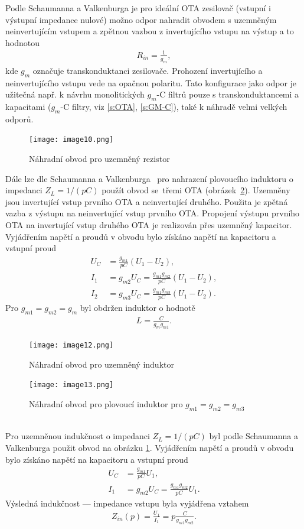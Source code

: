 \noindent Podle Schaumanna a Valkenburga \cite{13} je pro ideální OTA zesilovač (vstupní i výstupní impedance nulové) možno odpor nahradit obvodem s uzemněným neinvertujícím vstupem a zpětnou vazbou z invertujícího vstupu na výstup a to hodnotou
\begin{align}
R_{in} = \frac{1}{g_{m}},
\end{align}
kde $g_{m}$ označuje transkonduktanci zesilovače. Prohození invertujícího a neinvertujícího vstupu vede na opačnou polaritu. Tato konfigurace jako odpor je užitečná např. k návrhu monolitických $g_m$-C filtrů pouze s transkonduktancemi a kapacitami ($g_m$-C filtry, viz \ref{s:OTA}, \ref{s:GM-C}), také k náhradě velmi velkých odporů.
\begin{figure}[h]
\centering
\texttt{[image: image10.png]}
\caption[Náhradní obvod pro uzemněný rezistor]{Náhradní obvod pro uzemněný rezistor}
\end{figure}
\noindent Dále lze dle Schaumanna a Valkenburga~\cite{13} pro nahrazení plovoucího induktoru o impedanci $Z_L = 1/(pC)$ použít obvod se~třemi OTA (obrázek~\ref{s:IND0}). Uzemněny jsou invertující vstup prvního OTA a neinvertující druhého. Použita je zpětná vazba z výstupu na neinvertující vstup prvního OTA. Propojení výstupu prvního OTA na invertující vstup druhého OTA je realizován přes uzemněný kapacitor. \\
Vyjádřením napětí a proudů v obvodu bylo získáno napětí na kapacitoru a vstupní proud
\begin{align}\label{s:vzt2}
U_C &= \frac{g_{m1}}{pC}(U_1 - U_2), \\
I_1 &= g_{m2}U_C = \frac{g_{m1}g_{m2}}{pC}(U_1 - U_2), \\
I_2 &= g_{m3}U_C = \frac{g_{m1}g_{m3}}{pC}(U_1 - U_2).
\end{align}
Pro $g_{m1} = g_{m2} = g_{m}$ byl obdržen induktor o hodnotě
\begin{align}
L = \frac{C}{g_{m}g_{m1}}.
\end{align}
\begin{figure}[h]
\centering
\texttt{[image: image12.png]}
\caption[Náhradní obvod pro uzemněný induktor]{Náhradní obvod pro uzemněný induktor \label{s:IND}}
\end{figure}
\begin{figure}[h]
\centering
\texttt{[image: image13.png]}
\caption[Náhradní obvod pro plovoucí induktor]{Náhradní obvod pro plovoucí induktor pro $g_{m1} = g_{m2} = g_{m3}$\label{s:IND0}}
\end{figure}
\\
\noindent Pro uzemněnou indukčnost o impedanci $Z_L = 1/(pC)$ byl podle Schaumanna a Valkenburga \cite{13} použit obvod na obrázku \ref{s:IND}. Vyjádřením napětí a proudů v obvodu bylo získáno napětí na kapacitoru a vstupní proud
\begin{align}
U_C &= \frac{g_{m1}}{pC}U_1, \\
I_1 &= g_{m2}U_C = \frac{g_{m1}g_{m2}}{pC}U_1.
\end{align}
Výsledná indukčnost --- impedance vstupu byla vyjádřena vztahem
\begin{align}
Z_{in}(p) = \frac{U_1}{I_1} = p\frac{C}{g_{m1}g_{m2}}.
\end{align}
